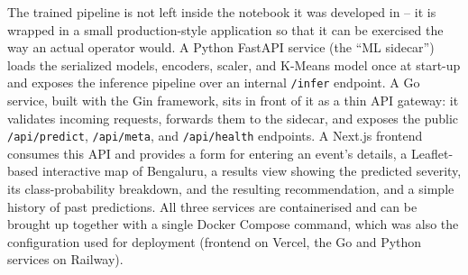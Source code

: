 The trained pipeline is not left inside the notebook it was developed in -- it is wrapped in a small production-style application so that it can be exercised the way an actual operator would. A Python FastAPI service (the ``ML sidecar'') loads the serialized models, encoders, scaler, and K-Means model once at start-up and exposes the inference pipeline over an internal \texttt{/infer} endpoint. A Go service, built with the Gin framework, sits in front of it as a thin API gateway: it validates incoming requests, forwards them to the sidecar, and exposes the public \texttt{/api/predict}, \texttt{/api/meta}, and \texttt{/api/health} endpoints. A Next.js frontend consumes this API and provides a form for entering an event's details, a Leaflet-based interactive map of Bengaluru, a results view showing the predicted severity, its class-probability breakdown, and the resulting recommendation, and a simple history of past predictions. All three services are containerised and can be brought up together with a single Docker Compose command, which was also the configuration used for deployment (frontend on Vercel, the Go and Python services on Railway).
